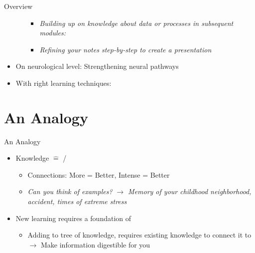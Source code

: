 \documentclass{ercisbeamer}
\begin{document}
\begin{frame}{Overview}
\begin{tbox}
\begin{itemize}
\begin{itemize}
\begin{itemize}
                    \item \emph{Building up on knowledge about \emph{data} or \emph{processes} in subsequent modules: }
                    \item \emph{Refining your notes step-by-step to create a presentation}
                \end{itemize}
            \end{itemize}
            \item On neurological level: Strengthening neural pathways
            \item With right learning techniques: 
        \end{itemize}
    \end{tbox}
\end{frame}

\section{An Analogy}
\begin{frame}{An Analogy}
    \pause
    \begin{tbox}
        \begin{itemize}
            \item Knowledge $\widehat =$   /  
            \begin{itemize}
                \item Connections: More = Better, Intense = Better
                \item \emph{Can you think of examples?} \pause \emph{$\rightarrow$ Memory of your childhood neighborhood, accident, times of extreme stress}
            \end{itemize}
            \item New learning requires a foundation of 
            \begin{itemize}
                \item Adding to tree of knowledge, requires existing knowledge to connect it to \\ $\rightarrow$ Make information digestible for you
            \end{itemize}
        \end{itemize}
    \end{tbox}
    
\end{frame}
\end{document}
